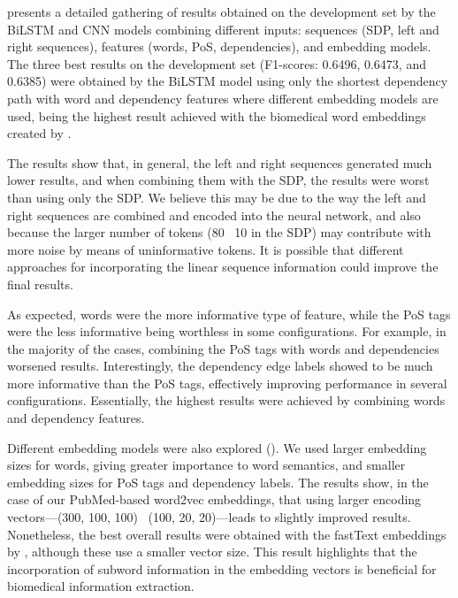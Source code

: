 

 presents a detailed gathering of results obtained on the development set by the BiLSTM and CNN models combining different inputs: sequences (SDP, left and right sequences), features (words, PoS, dependencies), and embedding models.
The three best results on the development set (F1-scores: 0.6496, 0.6473, and 0.6385) were obtained by the BiLSTM model using only the shortest dependency path with word and dependency features where different embedding models are used, being the highest result achieved with the biomedical word embeddings created by \textcite{chen2019g}.

The results show that, in general, the left and right sequences generated much lower results, and when combining them with the SDP, the results were worst than using only the SDP.
We believe this may be due to the way the left and right sequences are combined and encoded into the neural network, and also because the larger number of tokens (80 \versus\ 10 in the SDP) may contribute with more noise by means of uninformative tokens.
It is possible that different approaches for incorporating the linear sequence information could improve the final results.

As expected, words were the more informative type of feature, while the PoS tags were the less informative being worthless in some configurations.
For example, in the majority of the cases, combining the PoS tags with words and dependencies worsened results.
Interestingly, the dependency edge labels showed to be much more informative than the PoS tags, effectively improving performance in several configurations.
Essentially, the highest results were achieved by combining words and dependency features.

Different embedding models were also explored ().
We used larger embedding sizes for words, giving greater importance to word semantics, and smaller embedding sizes for PoS tags and dependency labels.
The results show, in the case of our PubMed-based word2vec embeddings, that using larger encoding vectors---(300, 100, 100) \versus\ (100, 20, 20)---leads to slightly improved results.
Nonetheless, the best overall results were obtained with the fastText embeddings by \textcite{chen2019g}, although these use a smaller vector size.
This result highlights that the incorporation of subword information in the embedding vectors is beneficial for biomedical information extraction.

